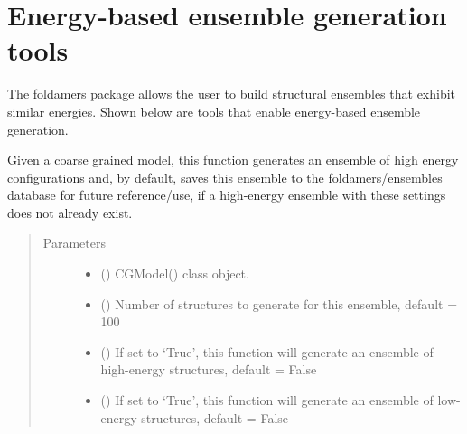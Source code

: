 \documentclass[letterpaper,12pt,english,openany,oneside]{sphinxmanual}
\begin{document}
\newpage


\section{Energy-based ensemble generation tools}
\label{\detokenize{ensembles:energy-based-ensemble-generation-tools}}
The foldamers package allows the user to build structural ensembles that exhibit similar energies.  Shown below are tools that enable energy-based ensemble generation.

\label{\detokenize{ensembles:module-ensembles.ens_build}}

\begin{fulllineitems}
\label{\detokenize{ensembles:ensembles.ens_build.get_ensemble}}
Given a coarse grained model, this function generates an ensemble of high energy configurations and, by default, saves this ensemble to the foldamers/ensembles database for future reference/use, if a high-energy ensemble with these settings does not already exist.
\begin{quote}\begin{description}
\item[{Parameters}] \leavevmode\begin{itemize}
\item {} 
 () \textendash{} CGModel() class object.

\item {} 
 () \textendash{} Number of structures to generate for this ensemble, default = 100

\item {} 
 () \textendash{} If set to ‘True’, this function will generate an ensemble of high-energy structures, default = False

\item {} 
 () \textendash{} If set to ‘True’, this function will generate an ensemble of low-energy structures, default = False


\end{itemize}
\end{description}
\end{quote}
\end{fulllineitems}
\end{document}
